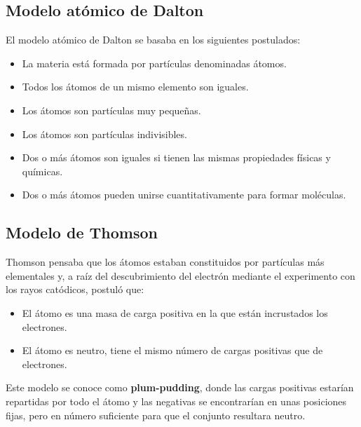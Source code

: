 \subsection{Modelo atómico de Dalton}
El modelo atómico de Dalton se basaba en los siguientes postulados:
\begin{itemize}
    \item La materia está formada por partículas denominadas átomos.
    \item Todos los átomos de un mismo elemento son iguales.
    \item Los átomos son partículas muy pequeñas.
    \item Los átomos son partículas indivisibles.
    \item Dos o más átomos son iguales si tienen las mismas propiedades físicas y químicas.
    \item Dos o más átomos pueden unirse cuantitativamente para formar moléculas.
\end{itemize}

\subsection{Modelo de Thomson}\label{subsec:modelo-de-thomson}
Thomson pensaba que los átomos estaban constituidos por partículas más elementales y, a raíz del descubrimiento del electrón mediante el experimento con los rayos catódicos, postuló que:
\begin{itemize}
    \item El átomo es una masa de carga positiva en la que están incrustados los electrones.
    \item El átomo es neutro, tiene el mismo número de cargas positivas que de electrones.
\end{itemize}

Este modelo se conoce como \textbf{plum-pudding}, donde las cargas positivas estarían repartidas por todo el átomo y las negativas se encontrarían en unas posiciones fijas, pero en número suficiente para que el conjunto resultara neutro.

